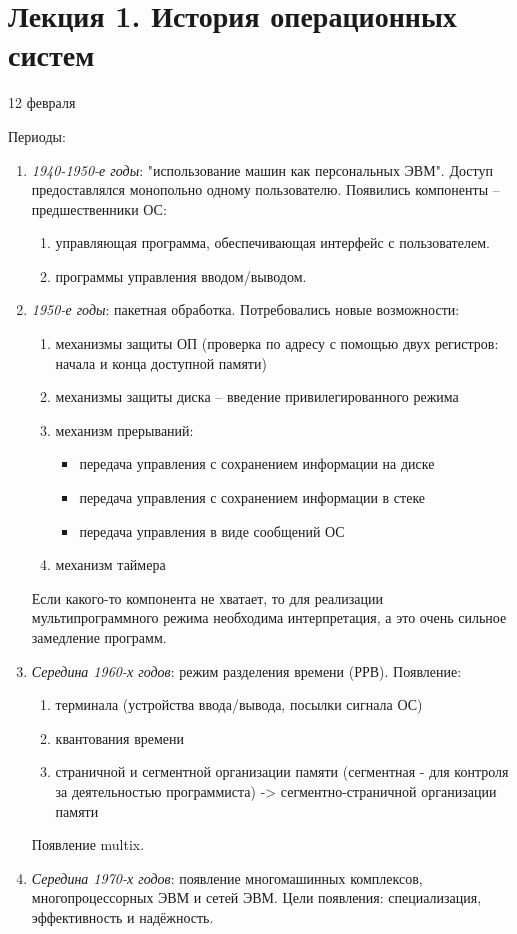 \documentclass[a4paper,12pt]{article}
\begin{document}
	\section{\bf Лекция 1. История операционных систем}
	\centerline{12 февраля}
	Периоды:
	\begin{enumerate}
		\item {\em 1940-1950-е годы}: "использование машин как персональных ЭВМ". Доступ 
		предоставлялся монопольно одному пользователю.
		Появились компоненты -- предшественники ОС: 
		\begin{enumerate}
			\item управляющая программа, обеспечивающая интерфейс с пользователем.
			\item программы управления вводом/выводом.
		\end{enumerate}
		\item {\em 1950-е годы}: пакетная обработка. Потребовались новые возможности:
		\begin{enumerate}
			\item механизмы защиты ОП (проверка по адресу с помощью двух регистров: начала и 
			конца доступной памяти)
			\item механизмы защиты диска -- введение привилегированного режима
			\item механизм прерываний:
			\begin{itemize}
				\item передача управления с сохранением информации на диске
				\item передача управления с сохранением информации в стеке
				\item передача управления в виде сообщений ОС
			\end{itemize}
			\item механизм таймера
		\end{enumerate}
		Если какого-то компонента не хватает, то для реализации мультипрограммного режима
		необходима интерпретация, а это очень сильное замедление программ.
		\item {\em Середина 1960-х годов}: режим разделения времени (РРВ). Появление:
		\begin{enumerate}
			\item терминала (устройства ввода/вывода, посылки сигнала ОС)
			\item квантования времени
			\item страничной и сегментной организации памяти (сегментная - для контроля за 
			деятельностью программиста) -> сегментно-страничной организации памяти
		\end{enumerate}
		Появление multix.
		\item {\em Середина 1970-х годов}: появление многомашинных комплексов, многопроцессорных 
		ЭВМ и сетей ЭВМ. Цели появления: специализация, эффективность и надёжность.	
	\end{enumerate}
\end{document}
